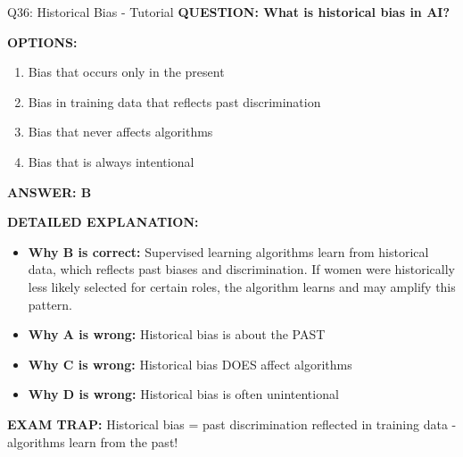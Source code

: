 \documentclass[8pt]{beamer}
\begin{document}
	\begin{frame}{Q36: Historical Bias - Tutorial}
		\fontsize{6.5}{7.5}\selectfont
		\textbf{QUESTION: What is historical bias in AI?}
		
		\vspace{0.1cm}
		\textbf{OPTIONS:}
		\begin{enumerate}
			\item Bias that occurs only in the present
			\item Bias in training data that reflects past discrimination
			\item Bias that never affects algorithms
			\item Bias that is always intentional
		\end{enumerate}
		
		\vspace{0.1cm}
		\textcolor{myblue}{\textbf{ANSWER: B}}
		
		\vspace{0.1cm}
		\textbf{DETAILED EXPLANATION:}
		\begin{itemize}
			\item \textbf{Why B is correct:} Supervised learning algorithms learn from historical data, which reflects past biases and discrimination. If women were historically less likely selected for certain roles, the algorithm learns and may amplify this pattern.
			\item \textbf{Why A is wrong:} Historical bias is about the PAST
			\item \textbf{Why C is wrong:} Historical bias DOES affect algorithms
			\item \textbf{Why D is wrong:} Historical bias is often unintentional
		\end{itemize}
		
		\textcolor{myred}{\textbf{EXAM TRAP:}} Historical bias = \textcolor{myblue}{past discrimination reflected in training data} - algorithms learn from the past!
	\end{frame}
	
\end{document}
